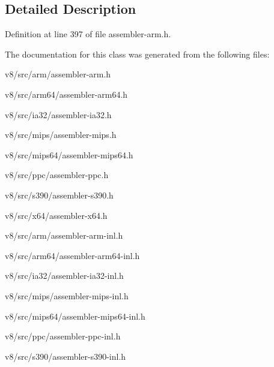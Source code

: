 \subsection{Detailed Description}


Definition at line 397 of file assembler-\/arm.\+h.



The documentation for this class was generated from the following files\+:\begin{DoxyCompactItemize}
\item 
v8/src/arm/assembler-\/arm.\+h\item 
v8/src/arm64/assembler-\/arm64.\+h\item 
v8/src/ia32/assembler-\/ia32.\+h\item 
v8/src/mips/assembler-\/mips.\+h\item 
v8/src/mips64/assembler-\/mips64.\+h\item 
v8/src/ppc/assembler-\/ppc.\+h\item 
v8/src/s390/assembler-\/s390.\+h\item 
v8/src/x64/assembler-\/x64.\+h\item 
v8/src/arm/assembler-\/arm-\/inl.\+h\item 
v8/src/arm64/assembler-\/arm64-\/inl.\+h\item 
v8/src/ia32/assembler-\/ia32-\/inl.\+h\item 
v8/src/mips/assembler-\/mips-\/inl.\+h\item 
v8/src/mips64/assembler-\/mips64-\/inl.\+h\item 
v8/src/ppc/assembler-\/ppc-\/inl.\+h\item 
v8/src/s390/assembler-\/s390-\/inl.\+h\end{DoxyCompactItemize}
